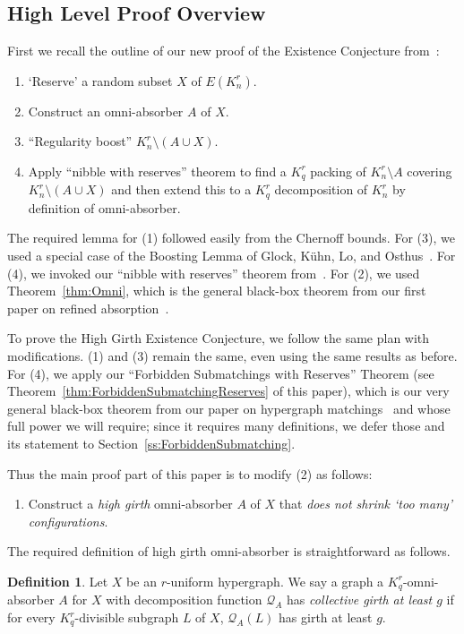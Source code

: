 \documentclass[11pt]{article}
\newcounter{i}
\theoremstyle{plain}
\theoremstyle{plain} %
\theoremstyle{definition}
\newtheorem{definition}[thm]{Definition}
\begin{document}
\subsection{High Level Proof Overview}

First we recall the outline of our new proof of the Existence Conjecture from~\cite{DPI}:

\begin{enumerate}
    \item[(1)] `Reserve' a random subset $X$ of $E(K_n^r)$.
    \item[(2)] Construct an omni-absorber $A$ of $X$.
    \item[(3)] ``Regularity boost'' $K_n^r\setminus (A\cup X)$.
    \item[(4)] Apply ``nibble with reserves'' theorem to find a $K_q^r$ packing of $K_n^r\setminus A$ covering $K_n^r\setminus (A\cup X)$ and then extend this to a $K_q^r$ decomposition of $K_n^r$ by definition of omni-absorber.  
\end{enumerate}
The required lemma for (1) followed easily from the Chernoff bounds. For (3), we used a special case of the Boosting Lemma of Glock, K\"{u}hn, Lo, and Osthus~\cite{GKLO16}. For (4), we invoked our ``nibble with reserves'' theorem from~\cite{DP22}.  For (2), we used Theorem~\ref{thm:Omni}, which is the general black-box theorem from our first paper on refined absorption~\cite{DPI}.

To prove the High Girth Existence Conjecture, we follow the same plan with modifications. (1) and (3) remain the same, even using the same results as before. For (4), we apply our ``Forbidden Submatchings with Reserves'' Theorem (see Theorem~\ref{thm:ForbiddenSubmatchingReserves} of this paper), which is our very general black-box theorem from our paper on hypergraph matchings~\cite{DP22} and whose full power we will require; since it requires many definitions, we defer those and its statement to Section~\ref{ss:ForbiddenSubmatching}.

Thus the main proof part of this paper is to modify (2) as follows:
\begin{enumerate}
    \item[(2')] Construct a \emph{high girth} omni-absorber $A$ of $X$ that \emph{does not shrink `too many' configurations}. 
\end{enumerate}

The required definition of high girth omni-absorber is straightforward as follows. 

\begin{definition}\label{def:OmniAbsorberCollectiveGirth}
Let $X$ be an $r$-uniform hypergraph. We say a graph a $K_q^r$-omni-absorber $A$ for $X$ with decomposition function $\mathcal{Q}_A$ has \emph{collective girth at least $g$} if for every $K_q^r$-divisible subgraph $L$ of $X$, $\mathcal{Q}_A(L)$ has girth at least $g$. 
\end{definition}
\end{document}
